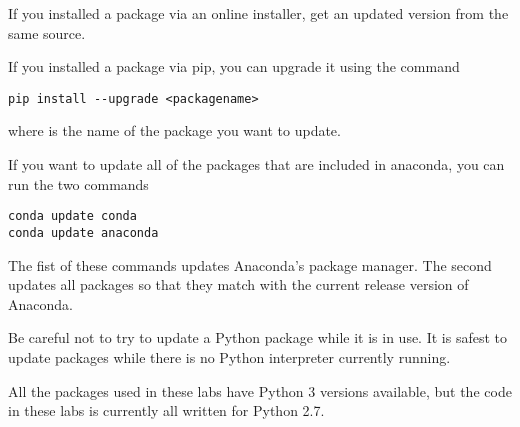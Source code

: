 If you installed a package via an online installer, get an updated version from the same source.

If you installed a package via pip, you can upgrade it using the command
\begin{lstlisting}[style=ShellInput]
pip install --upgrade <packagename>
\end{lstlisting}
where  is the name of the package you want to update.

If you want to update all of the packages that are included in anaconda, you can run the two commands
\begin{lstlisting}[style=ShellInput]
conda update conda
conda update anaconda
\end{lstlisting}
The fist of these commands updates Anaconda's package manager.
The second updates all packages so that they match with the current release version of Anaconda.

\begin{warn}
Be careful not to try to update a Python package while it is in use.
It is safest to update packages while there is no Python interpreter currently running.
\end{warn}

\begin{info}
All the packages used in these labs have Python 3 versions available, but the code in these labs is currently all written for Python 2.7.
\end{info}